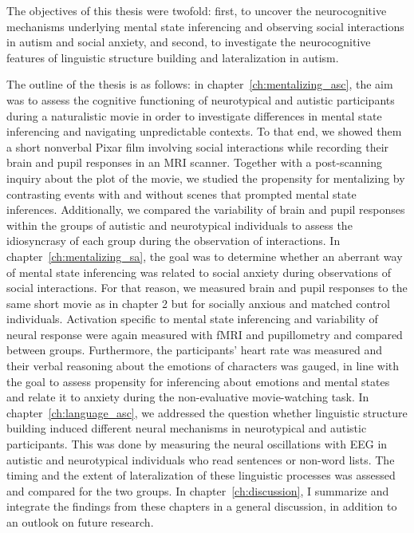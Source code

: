 The objectives of this thesis were twofold: first, to uncover the neurocognitive mechanisms underlying mental state inferencing and observing social interactions in autism and social anxiety, and second, to investigate the neurocognitive features of linguistic structure building and lateralization in autism. 

The outline of the thesis is as follows: in chapter~\ref{ch:mentalizing_asc}, the aim was to assess the cognitive functioning of neurotypical and autistic participants during a naturalistic movie in order to investigate differences in mental state inferencing and navigating unpredictable contexts. To that end, we showed them a short nonverbal Pixar film involving social interactions while recording their brain and pupil responses in an MRI scanner. Together with a post-scanning inquiry about the plot of the movie, we studied the propensity for mentalizing by contrasting events with and without scenes that prompted mental state inferences. Additionally, we compared the variability of brain and pupil responses within the groups of autistic and neurotypical individuals to assess the idiosyncrasy of each group during the observation of interactions. In chapter~\ref{ch:mentalizing_sa}, the goal was to determine whether an aberrant way of mental state inferencing was related to social anxiety during observations of social interactions. For that reason, we measured brain and pupil responses to the same short movie as in chapter 2 but for socially anxious and matched control individuals. Activation specific to mental state inferencing and variability of neural response were again measured with fMRI and pupillometry and compared between groups. Furthermore, the participants' heart rate was measured and their verbal reasoning about the emotions of characters was gauged, in line with the goal to assess propensity for inferencing about emotions and mental states and relate it to anxiety during the non-evaluative movie-watching task. In chapter~\ref{ch:language_asc}, we addressed the question whether linguistic structure building induced different neural mechanisms in neurotypical and autistic participants. This was done by measuring the neural oscillations with EEG in autistic and neurotypical individuals who read sentences or non-word lists. The timing and the extent of lateralization of these linguistic processes was assessed and compared for the two groups. In chapter~\ref{ch:discussion}, I summarize and integrate the findings from these chapters in a general discussion, in addition to an outlook on future research.
